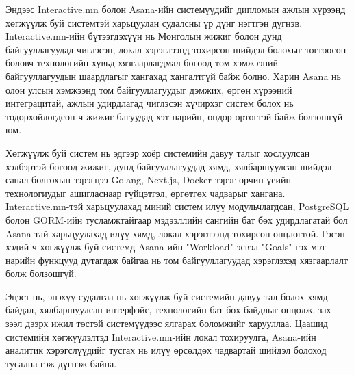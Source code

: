 
Эндээс Interactive.mn болон Asana-ийн системүүдийг дипломын ажлын хүрээнд хөгжүүлж буй системтэй харьцуулан судалсны үр дүнг нэгтгэн дүгнэв. Interactive.mn-ийн бүтээгдэхүүн нь Монголын жижиг болон дунд байгууллагуудад чиглэсэн, локал хэрэглээнд тохирсон шийдэл болохыг тогтоосон боловч технологийн хувьд хязгаарлагдмал бөгөөд том хэмжээний байгууллагуудын шаардлагыг хангахад хангалтгүй байж болно. Харин Asana нь олон улсын хэмжээнд том байгууллагуудыг дэмжих, өргөн хүрээний интеграцитай, ажлын удирдлагад чиглэсэн хүчирхэг систем болох нь тодорхойлогдсон ч жижиг багуудад хэт нарийн, өндөр өртөгтэй байж болзошгүй юм.

 Хөгжүүлж буй систем нь эдгээр хоёр системийн давуу талыг хослуулсан хэлбэртэй бөгөөд жижиг, дунд байгууллагуудад хямд, хялбаршуулсан шийдэл санал болгохын зэрэгцээ Golang, Next.js, Docker зэрэг орчин үеийн технологиудыг ашигласнаар гүйцэтгэл, өргөтгөх чадварыг хангана. Interactive.mn-тэй харьцуулахад миний систем илүү модульчлагдсан, PostgreSQL болон GORM-ийн тусламжтайгаар мэдээллийн сангийн бат бөх удирдлагатай бол Asana-тай харьцуулахад илүү хямд, локал хэрэглээнд тохирсон онцлогтой. Гэсэн хэдий ч хөгжүүлж буй системд Asana-ийн "Workload" эсвэл "Goals" гэх мэт нарийн функцууд дутагдаж байгаа нь том байгууллагуудад хэрэглэхэд хязгаарлалт болж болзошгүй.

Эцэст нь, энэхүү судалгаа нь хөгжүүлж буй системийн давуу тал болох хямд байдал, хялбаршуулсан интерфэйс, технологийн бат бөх байдлыг онцолж, зах зээл дээрх ижил төстэй системүүдээс ялгарах боломжийг харууллаа. Цаашид системийн хөгжүүлэлтэд Interactive.mn-ийн локал тохируулга, Asana-ийн аналитик хэрэгслүүдийг тусгах нь илүү өрсөлдөх чадвартай шийдэл болоход тусална гэж дүгнэж байна.